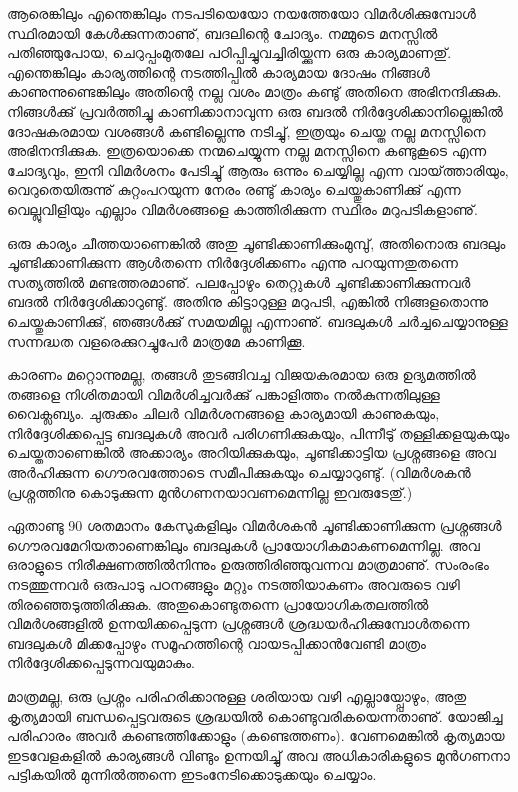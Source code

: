 ﻿

\vskip 2pt

ആരെങ്കിലും എന്തെങ്കിലും നടപടിയെയോ നയത്തേയോ വിമര്‍ശിക്കുമ്പോള്‍ സ്ഥിരമായി കേള്‍ക്കുന്നതാണു്, ബദലിന്റെ ചോദ്യം. 
നമ്മുടെ മനസ്സില്‍ പതിഞ്ഞുപോയ, ചെറുപ്പംമുതലേ പഠിപ്പിച്ചുവച്ചിരിയ്ക്കുന്ന ഒരു കാര്യമാണതു്. എന്തെങ്കിലും കാര്യത്തിന്റെ നടത്തിപ്പില്‍ 
കാര്യമായ ദോഷം നിങ്ങള്‍ കാണുന്നുണ്ടെങ്കിലും അതിന്റെ നല്ല വശം മാത്രം കണ്ടു് അതിനെ അഭിനന്ദിക്കുക. നിങ്ങള്‍ക്കു് പ്രവര്‍ത്തിച്ചു
 കാണിക്കാനാവുന്ന ഒരു ബദല്‍ നിര്‍ദ്ദേശിക്കാനില്ലെങ്കില്‍ ദോഷകരമായ വശങ്ങള്‍ കണ്ടില്ലെന്നു നടിച്ചു്, ഇത്രയും ചെയ്ത നല്ല മനസ്സിനെ 
 അഭിനന്ദിക്കുക. ഇത്രയൊക്കെ നന്മചെയ്യുന്ന നല്ല മനസ്സിനെ കണ്ടുകൂടെ എന്ന ചോദ്യവും, ഇനി വിമര്‍ശനം പേടിച്ചു് ആരും ഒന്നും ചെയ്യില്ല 
 എന്ന വായ്‌ത്താരിയും, വെറുതെയിരുന്നു് കുറ്റംപറയുന്ന നേരം രണ്ടു് കാര്യം ചെയ്തുകാണിക്കു് എന്ന വെല്ലുവിളിയും എല്ലാം വിമര്‍ശങ്ങളെ 
 കാത്തിരിക്കുന്ന സ്ഥിരം മറുപടികളാണു്.

ഒരു കാര്യം ചീത്തയാണെങ്കില്‍ അതു ചൂണ്ടിക്കാണിക്കുംമുമ്പു്, അതിനൊരു ബദലും ചൂണ്ടിക്കാണിക്കുന്ന ആള്‍തന്നെ നിര്‍ദ്ദേശിക്കണം 
എന്നു പറയുന്നതുതന്നെ സത്യത്തില്‍ മണ്ടത്തരമാണു്. പലപ്പോഴും തെറ്റുകള്‍ ചൂണ്ടിക്കാണിക്കുന്നവര്‍ ബദല്‍ നിര്‍ദ്ദേശിക്കാറുണ്ടു്. 
അതിനു കിട്ടാറുള്ള മറുപടി, എങ്കില്‍ നിങ്ങളതൊന്നു ചെയ്തുകാണിക്കു്, ഞങ്ങള്‍ക്കു് സമയമില്ല എന്നാണു്. ബദലുകള്‍ ചര്‍ച്ചചെയ്യാനുള്ള
 സന്നദ്ധത വളരെക്കുറച്ചുപേര്‍ മാത്രമേ കാണിക്കൂ.

കാരണം മറ്റൊന്നുമല്ല, തങ്ങള്‍ തുടങ്ങിവച്ച വിജയകരമായ ഒരു ഉദ്യമത്തില്‍ തങ്ങളെ നിശിതമായി വിമര്‍ശിച്ചവര്‍ക്കു് പങ്കാളിത്തം
 നല്‍കുന്നതിലുള്ള വൈക്ലബ്യം. ചുരുക്കം ചിലര്‍ വിമര്‍ശനങ്ങളെ കാര്യമായി കാണുകയും, നിര്‍ദ്ദേശിക്കപ്പെട്ട ബദലുകള്‍ അവര്‍ 
 പരിഗണിക്കുകയും, പിന്നീടു് തള്ളിക്കളയുകയും ചെയ്തതാണെങ്കില്‍ അക്കാര്യം അറിയിക്കുകയും, ചൂണ്ടിക്കാട്ടിയ പ്രശ്നങ്ങളെ അവ അര്‍ഹിക്കുന്ന 
 ഗൌരവത്തോടെ സമീപിക്കുകയും ചെയ്യാറുണ്ടു്. (വിമര്‍ശകന്‍ പ്രശ്നത്തിനു കൊടുക്കുന്ന മുന്‍ഗണനയാവണമെന്നില്ല ഇവരുടേതു്.)

ഏതാണ്ടു 90 ശതമാനം കേസുകളിലും വിമര്‍ശകന്‍ ചൂണ്ടിക്കാണിക്കുന്ന പ്രശ്നങ്ങള്‍ ഗൌരവമേറിയതാണെങ്കിലും ബദലുകള്‍ 
പ്രായോഗികമാകണമെന്നില്ല. അവ ഒരാളുടെ നിരീക്ഷണത്തില്‍നിന്നും ഉരുത്തിരിഞ്ഞുവന്നവ മാത്രമാണു്. 
സംരംഭം നടത്തുന്നവര്‍ ഒരുപാടു പഠനങ്ങളും മറ്റും നടത്തിയാകണം അവരുടെ വഴി തിരഞ്ഞെടുത്തിരിക്കുക. അതുകൊണ്ടുതന്നെ
 പ്രായോഗികതലത്തില്‍ വിമര്‍ശങ്ങളില്‍ ഉന്നയിക്കപ്പെടുന്ന പ്രശ്നങ്ങള്‍ ശ്രദ്ധയര്‍ഹിക്കുമ്പോള്‍തന്നെ ബദലുകള്‍ മിക്കപ്പോഴും 
 സമൂഹത്തിന്റെ വായടപ്പിക്കാന്‍വേണ്ടി മാത്രം നിര്‍ദ്ദേശിക്കപ്പെടുന്നവയുമാകും.

മാത്രമല്ല, ഒരു പ്രശ്നം പരിഹരിക്കാനുള്ള ശരിയായ വഴി എല്ലായ്പ്പോഴും, അതു കൃത്യമായി ബന്ധപ്പെട്ടവരുടെ ശ്രദ്ധയില്‍ 
കൊണ്ടുവരികയെന്നതാണു്. യോജിച്ച പരിഹാരം അവര്‍ കണ്ടെത്തിക്കോളും (കണ്ടെത്തണം). വേണമെങ്കില്‍ കൃത്യമായ ഇടവേളകളില്‍ 
കാര്യങ്ങള്‍ വിണ്ടും ഉന്നയിച്ചു് അവ അധികാരികളുടെ മുന്‍ഗണനാ പട്ടികയില്‍ മുന്നില്‍ത്തന്നെ ഇടംനേടിക്കൊടുക്കയും ചെയ്യാം.

